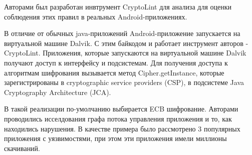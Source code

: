 \documentclass[11pt, a4paper]{article}		%
\begin{document}
Авторами был разработан инвтрумент CryptoLint для анализа для оценки соблюдения этих правил в реальных Android-приложениях.

В отличие от обычных java-приложений Android-приложение запускается на виртуальной машине Dalvik. С этим байкодом и работает инструмент авторов - CryptoLint. Приложения, которые запускаются на виртуальной машине Dalvik получают доступ к интерфейсу и подсистемам. Для получения доступа к алгоритмам шифрования вызывается метод Cipher.getInstance, которые зарегистрированы в cryptographic service providers
(CSP), в подсистеме Java Cryptography Architecture (JCA). 

В такой реализации по-умолчанию выбирается ECB шифрование. Авторами проводились исселдования графа потока управления приложения и то, как находились нарушения. В качестве примера было рассмотрено 3 популярных приложения с уязвимостями, при этом эти приложения имели миллионы скачиваний. 
\end{document}
